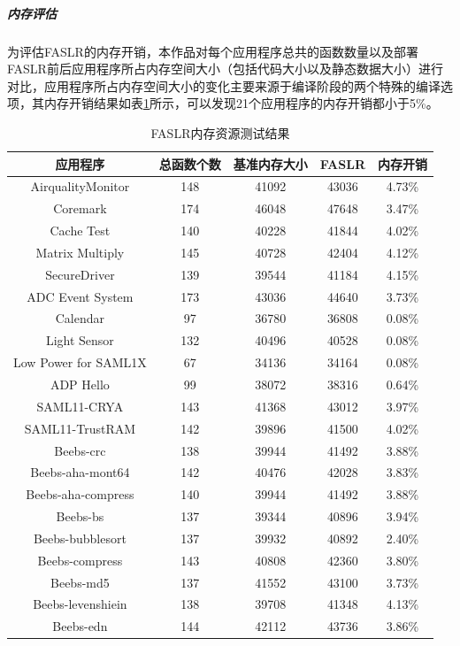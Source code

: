 \documentclass[UTF8,12pt,a4paper]{ctexart}
\numberwithin{figure}{section}
\begin{document}
\subparagraph{内存评估}
\par 为评估FASLR的内存开销，本作品对每个应用程序总共的函数数量以及部署FASLR前后应用程序所占内存空间大小（包括代码大小以及静态数据大小）进行对比，应用程序所占内存空间大小的变化主要来源于编译阶段的两个特殊的编译选项，其内存开销结果如表\ref{table2}所示，可以发现21个应用程序的内存开销都小于5\%。
\begin{longtable}{ccccc}
    \caption{FASLR内存资源测试结果}
    \label{table2}                                         \\
    \hline
    应用程序                 & 总函数个数 & 基准内存大小 & FASLR & 内存开销   \\ \hline
    AirqualityMonitor    & 148   & 41092  & 43036 & 4.73\% \\ 
    Coremark             & 174   & 46048  & 47648 & 3.47\% \\ 
    Cache Test           & 140   & 40228  & 41844 & 4.02\% \\ 
    Matrix Multiply      & 145   & 40728  & 42404 & 4.12\% \\ 
    SecureDriver         & 139   & 39544  & 41184 & 4.15\% \\ 
    ADC Event System     & 173   & 43036  & 44640 & 3.73\% \\ 
    Calendar             & 97    & 36780  & 36808 & 0.08\% \\ 
    Light Sensor         & 132   & 40496  & 40528 & 0.08\% \\ 
    Low Power for SAML1X & 67    & 34136  & 34164 & 0.08\% \\ 
    ADP Hello            & 99    & 38072  & 38316 & 0.64\% \\ 
    SAML11-CRYA          & 143   & 41368  & 43012 & 3.97\% \\ 
    SAML11-TrustRAM      & 142   & 39896  & 41500 & 4.02\% \\ 
    Beebs-crc            & 138   & 39944  & 41492 & 3.88\% \\ 
    Beebs-aha-mont64     & 142   & 40476  & 42028 & 3.83\% \\ 
    Beebs-aha-compress   & 140   & 39944  & 41492 & 3.88\% \\ 
    Beebs-bs             & 137   & 39344  & 40896 & 3.94\% \\ 
    Beebs-bubblesort     & 137   & 39932  & 40892 & 2.40\% \\ 
    Beebs-compress       & 143   & 40808  & 42360 & 3.80\% \\ 
    Beebs-md5            & 137   & 41552  & 43100 & 3.73\% \\ 
    Beebs-levenshiein    & 138   & 39708  & 41348 & 4.13\% \\ 
    Beebs-edn            & 144   & 42112  & 43736 & 3.86\% \\ \hline
\end{longtable}
\end{document}
